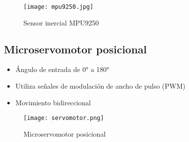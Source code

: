 \begin{figure}[htb]
	\centering
	\texttt{[image: mpu9250.jpg]}
	\caption{Sensor inercial MPU9250}
\end{figure}





\subsection*{Microservomotor posicional}
\begin{itemize}
	\item Ángulo de entrada de 0° a 180°
	\item Utiliza señales de modulación de ancho de pulso (PWM)
	\item Movimiento bidireccional
\end{itemize}

\begin{figure}[htb]
	\centering
	\texttt{[image: servomotor.png]}
	\caption{Microservomotor posicional}
\end{figure}